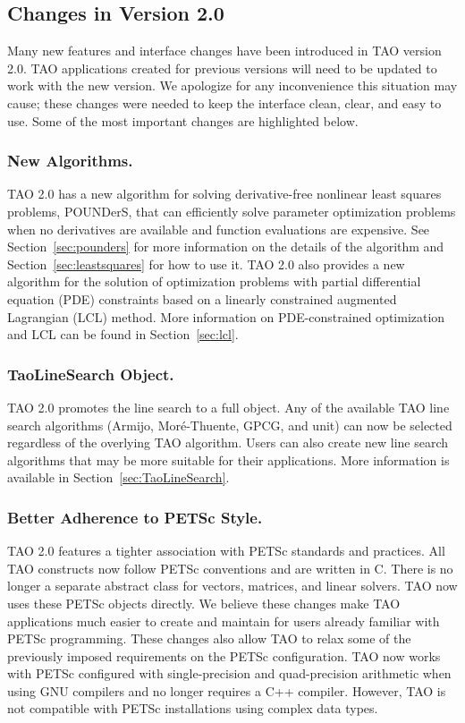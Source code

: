 \subsection*{Changes in Version 2.0}

Many new features and interface changes have been introduced in TAO version 2.0.
TAO applications created for previous versions will need to be updated to 
work with the new version.  We apologize for any inconvenience this situation
may cause; these changes were needed to keep the interface
clean, 
clear, and easy to use. Some of the most important changes are highlighted 
below.

\subsubsection*{New Algorithms.}
TAO 2.0 has a new algorithm for solving derivative-free nonlinear least
squares
problems, POUNDerS, that can efficiently solve parameter optimization problems 
when no derivatives are available and function evaluations are expensive. 
See 
Section~\ref{sec:pounders} for more information on the details of the 
algorithm and Section~\ref{sec:leastsquares} for how to use it.
TAO 2.0 also provides a new algorithm for the solution of optimization
problems with partial differential equation (PDE) constraints based on a
linearly constrained augmented Lagrangian (LCL) method.  More 
information on PDE-constrained optimization and LCL can be found 
in Section~\ref{sec:lcl}.

\subsubsection*{TaoLineSearch Object.}
TAO 2.0 promotes the line search to a full object.  Any of the available 
TAO line search algorithms (Armijo, Mor\'e-Thuente, GPCG, and unit) can now 
be selected regardless of the overlying TAO algorithm.  Users can also
create new line search algorithms that may be more suitable for their
applications.  More information is available in 
Section~\ref{sec:TaoLineSearch}.

\subsubsection*{Better Adherence to PETSc Style.}
TAO 2.0 features a tighter association with PETSc standards and practices.  All 
TAO constructs now follow PETSc conventions and are written in C.  There is 
no longer a separate abstract class for vectors, matrices, and linear 
solvers. TAO now uses these PETSc objects directly.  We believe these 
changes make TAO applications much easier to create and maintain for 
users already familiar with PETSc programming. These changes also allow 
TAO to relax some of the previously imposed requirements on the PETSc 
configuration.  TAO now works with PETSc configured with single-precision 
and quad-precision arithmetic when using GNU compilers and no longer 
requires a C++ compiler.  However, TAO is not compatible with PETSc 
installations using complex data types.

